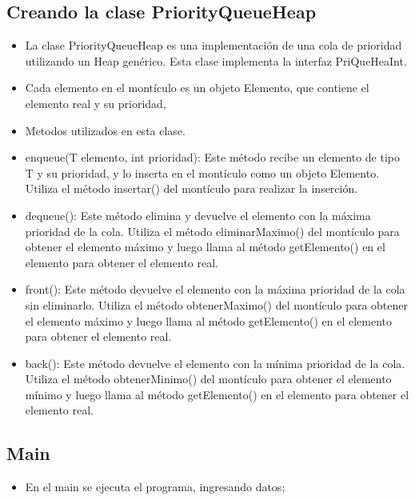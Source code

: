 \documentclass{article}
\begin{document}
	\subsection{Creando la clase PriorityQueueHeap}
	\begin{itemize}
		\item La clase PriorityQueueHeap es una implementación de una cola de prioridad utilizando un Heap genérico. Esta clase implementa la interfaz PriQueHeaInt.
		\item Cada elemento en el montículo es un objeto Elemento, que contiene el elemento real y su prioridad,
		\item Metodos utilizados en esta clase.
		\item enqueue(T elemento, int prioridad): Este método recibe un elemento de tipo T y su prioridad, y lo inserta en el montículo como un objeto Elemento. Utiliza el método insertar() del montículo para realizar la inserción.
		\item dequeue(): Este método elimina y devuelve el elemento con la máxima prioridad de la cola. Utiliza el método eliminarMaximo() del montículo para obtener el elemento máximo y luego llama al método getElemento() en el elemento para obtener el elemento real.
		\item front(): Este método devuelve el elemento con la máxima prioridad de la cola sin eliminarlo. Utiliza el método obtenerMaximo() del montículo para obtener el elemento máximo y luego llama al método getElemento() en el elemento para obtener el elemento real.
		\item back(): Este método devuelve el elemento con la mínima prioridad de la cola. Utiliza el método obtenerMinimo() del montículo para obtener el elemento mínimo y luego llama al método getElemento() en el elemento para obtener el elemento real.
	\end{itemize}
	
	\subsection{Main}
	\begin{itemize}
		\item En el main se ejecuta el programa, ingresando datos;
	\end{itemize}
	
	
\end{document}
